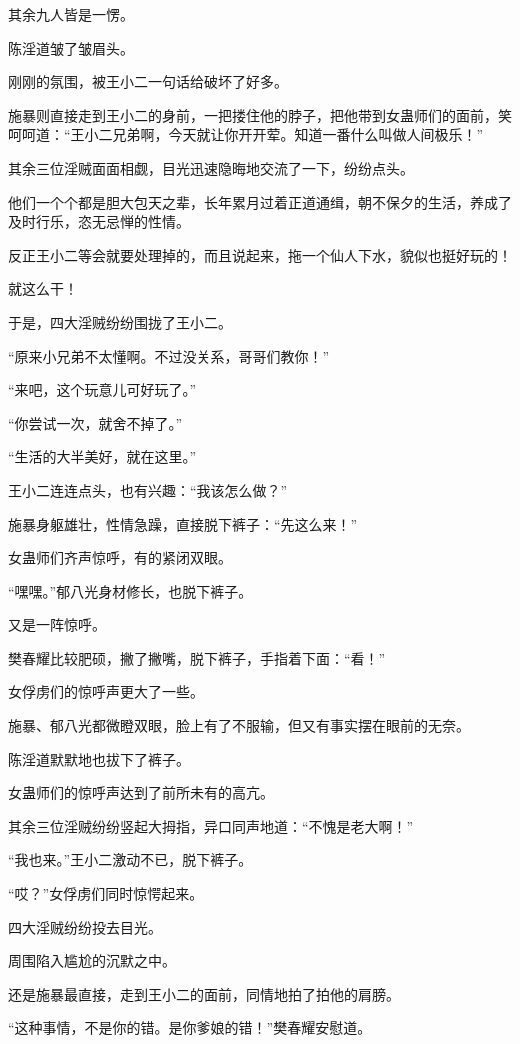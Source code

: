 \begin{this_body}
其余九人皆是一愣。

陈淫道皱了皱眉头。

刚刚的氛围，被王小二一句话给破坏了好多。

施暴则直接走到王小二的身前，一把搂住他的脖子，把他带到女蛊师们的面前，笑呵呵道：“王小二兄弟啊，今天就让你开开荤。知道一番什么叫做人间极乐！”

其余三位淫贼面面相觑，目光迅速隐晦地交流了一下，纷纷点头。

他们一个个都是胆大包天之辈，长年累月过着正道通缉，朝不保夕的生活，养成了及时行乐，恣无忌惮的性情。

反正王小二等会就要处理掉的，而且说起来，拖一个仙人下水，貌似也挺好玩的！

就这么干！

于是，四大淫贼纷纷围拢了王小二。

“原来小兄弟不太懂啊。不过没关系，哥哥们教你！”

“来吧，这个玩意儿可好玩了。”

“你尝试一次，就舍不掉了。”

“生活的大半美好，就在这里。”

王小二连连点头，也有兴趣：“我该怎么做？”

施暴身躯雄壮，性情急躁，直接脱下裤子：“先这么来！”

女蛊师们齐声惊呼，有的紧闭双眼。

“嘿嘿。”郁八光身材修长，也脱下裤子。

又是一阵惊呼。

樊春耀比较肥硕，撇了撇嘴，脱下裤子，手指着下面：“看！”

女俘虏们的惊呼声更大了一些。

施暴、郁八光都微瞪双眼，脸上有了不服输，但又有事实摆在眼前的无奈。

陈淫道默默地也拔下了裤子。

女蛊师们的惊呼声达到了前所未有的高亢。

其余三位淫贼纷纷竖起大拇指，异口同声地道：“不愧是老大啊！”

“我也来。”王小二激动不已，脱下裤子。

“哎？”女俘虏们同时惊愕起来。

四大淫贼纷纷投去目光。

周围陷入尴尬的沉默之中。

还是施暴最直接，走到王小二的面前，同情地拍了拍他的肩膀。

“这种事情，不是你的错。是你爹娘的错！”樊春耀安慰道。


\end{this_body}
